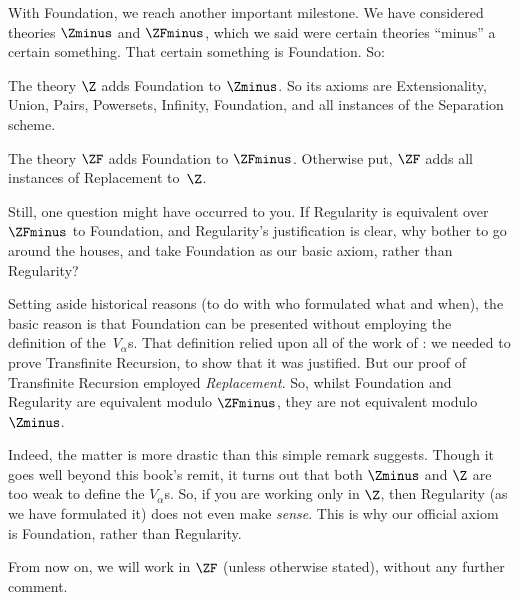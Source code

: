 \documentclass[../../../include/open-logic-section]{subfiles}
\begin{document}

With Foundation, we reach another important milestone. We have
considered theories $\Zminus$ and $\ZFminus$, which we said were
certain theories ``minus'' a certain something. That certain something
is Foundation. So:

\begin{defn}
The theory $\Z$ adds Foundation to $\Zminus$. So its axioms are
Extensionality, Union, Pairs, Powersets, Infinity, Foundation, and all
instances of the Separation scheme.

The theory $\ZF$ adds Foundation to $\ZFminus$. Otherwise put, $\ZF$
adds all instances of Replacement to~$\Z$.
\end{defn}

Still, one question might have occurred to you. If Regularity is
equivalent over $\ZFminus$ to Foundation, and Regularity's
justification is clear, why bother to go around the houses, and take
Foundation as our basic axiom, rather than Regularity? 

Setting aside historical reasons (to do with who formulated what and
when), the basic reason is that Foundation can be presented without
employing the definition of the~$V_\alpha$s. That definition relied
upon all of the work of : we
needed to prove Transfinite Recursion, to show that it was justified.
But our proof of Transfinite Recursion employed \emph{Replacement}.
So, whilst Foundation and Regularity are equivalent modulo $\ZFminus$,
they are not equivalent modulo $\Zminus$. 

Indeed, the matter is more drastic than this simple remark suggests.
Though it goes well beyond this book's remit, it turns out that both
$\Zminus$ and $\Z$ are too weak to define the $V_\alpha$s. So, if you
are working only in $\Z$, then Regularity (as we have formulated it)
does not even make \emph{sense}. This is why our official axiom is
Foundation, rather than Regularity. 

From now on, we will work in $\ZF$ (unless otherwise stated), without
any further comment. 
\end{document}
